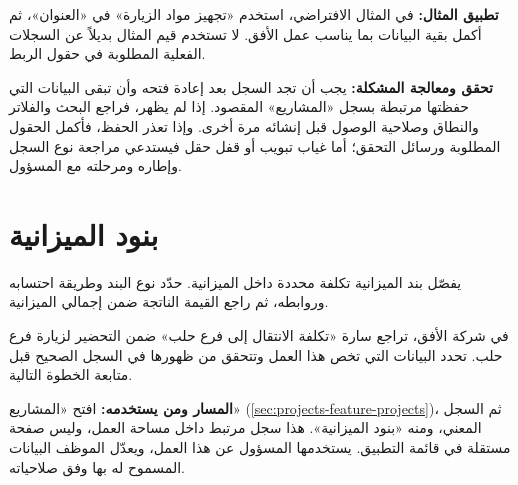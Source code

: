 \textbf{تطبيق المثال:} في المثال الافتراضي، استخدم «تجهيز مواد الزيارة» في «العنوان»، ثم أكمل بقية البيانات بما يناسب عمل الأفق. لا تستخدم قيم المثال بديلاً عن السجلات الفعلية المطلوبة في حقول الربط.

\textbf{تحقق ومعالجة المشكلة:} يجب أن تجد السجل بعد إعادة فتحه وأن تبقى البيانات التي حفظتها مرتبطة بسجل «المشاريع» المقصود. إذا لم يظهر، فراجع البحث والفلاتر والنطاق وصلاحية الوصول قبل إنشائه مرة أخرى. وإذا تعذر الحفظ، فأكمل الحقول المطلوبة ورسائل التحقق؛ أما غياب تبويب أو قفل حقل فيستدعي مراجعة نوع السجل وإطاره ومرحلته مع المسؤول.

\clearpage
\section{بنود الميزانية}
\label{sec:projects-feature-budget-lines}

يفصّل بند الميزانية تكلفة محددة داخل الميزانية. حدّد نوع البند وطريقة احتسابه وروابطه، ثم راجع القيمة الناتجة ضمن إجمالي الميزانية.

\begin{rcnote}
في شركة الأفق، تراجع سارة «تكلفة الانتقال إلى فرع حلب» ضمن التحضير لزيارة فرع حلب. تحدد البيانات التي تخص هذا العمل وتتحقق من ظهورها في السجل الصحيح قبل متابعة الخطوة التالية.
\end{rcnote}

\textbf{المسار ومن يستخدمه:} افتح «المشاريع» (\ref{sec:projects-feature-projects})، ثم السجل المعني، ومنه «بنود الميزانية». هذا سجل مرتبط داخل مساحة العمل، وليس صفحة مستقلة في قائمة التطبيق. يستخدمها المسؤول عن هذا العمل، ويعدّل الموظف البيانات المسموح له بها وفق صلاحياته.

